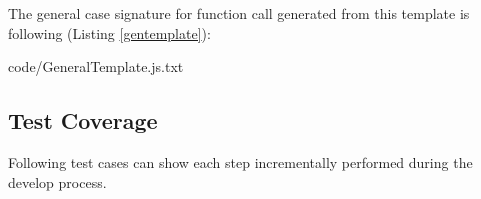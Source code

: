 %
%


The general case signature for function call generated from this template is following (Listing \ref{gentemplate}):

{code/GeneralTemplate.js.txt}

\subsection{Test Coverage}
Following test cases can show each step incrementally performed during the develop process.

%

